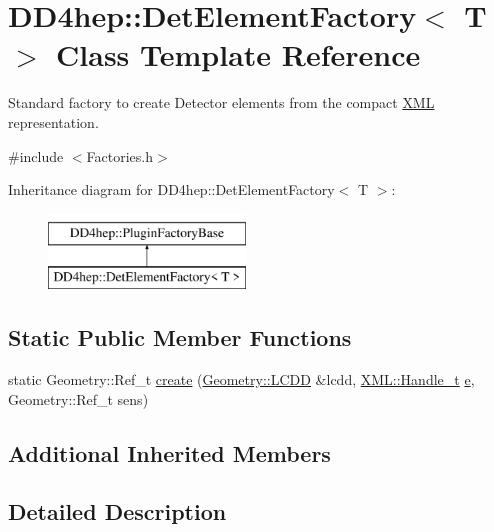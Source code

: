 \hypertarget{class_d_d4hep_1_1_det_element_factory}{}\section{D\+D4hep\+:\+:Det\+Element\+Factory$<$ T $>$ Class Template Reference}
\label{class_d_d4hep_1_1_det_element_factory}


Standard factory to create Detector elements from the compact \hyperlink{namespace_d_d4hep_1_1_x_m_l}{X\+ML} representation.  




{\ttfamily \#include $<$Factories.\+h$>$}

Inheritance diagram for D\+D4hep\+:\+:Det\+Element\+Factory$<$ T $>$\+:\begin{figure}[H]
\begin{center}
\leavevmode
\includegraphics[height=2.000000cm]{class_d_d4hep_1_1_det_element_factory}
\end{center}
\end{figure}
\subsection*{Static Public Member Functions}
\begin{DoxyCompactItemize}
\item 
static Geometry\+::\+Ref\+\_\+t \hyperlink{class_d_d4hep_1_1_det_element_factory_aaf2f69411f75e9d157627298c3c5fb95}{create} (\hyperlink{class_d_d4hep_1_1_geometry_1_1_l_c_d_d}{Geometry\+::\+L\+C\+DD} \&lcdd, \hyperlink{class_d_d4hep_1_1_x_m_l_1_1_handle__t}{X\+M\+L\+::\+Handle\+\_\+t} \hyperlink{_volumes_8cpp_a8a9a1f93e9b09afccaec215310e64142}{e}, Geometry\+::\+Ref\+\_\+t sens)
\end{DoxyCompactItemize}
\subsection*{Additional Inherited Members}


\subsection{Detailed Description}
